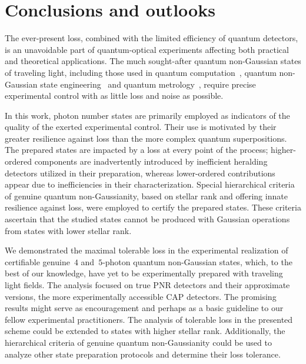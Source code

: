 \documentclass{article}
\begin{document}
%

\FloatBarrier
\section{Conclusions and outlooks}

The ever-present loss, combined with the limited efficiency of quantum detectors, is an unavoidable part of quantum-optical experiments affecting both practical and theoretical applications. The much sought-after quantum non-Gaussian states of traveling light, including those used in quantum computation~\cite{lloyd1999,gottesman2001,menicucci2014,baragiola2019,bourassa2021,madsen2022,aghaeerad2025}, quantum non-Gaussian state engineering~\cite{filip2005,marek2009,marek2011,yukawa2013b,miyata2016,marek2018a,sakaguchi2023} and quantum metrology~\cite{oh2020,hanamura2023}, require precise experimental control with as little loss and noise as possible.

In this work, photon number states are primarily employed as indicators of the quality of the exerted experimental control. Their use is motivated by their greater resilience against loss than the more complex quantum superpositions. The prepared states are impacted by a loss at every point of the process; higher-ordered components are inadvertently introduced by inefficient heralding detectors utilized in their preparation, whereas lower-ordered contributions appear due to inefficiencies in their characterization. Special hierarchical criteria of genuine quantum non-Gaussianity, based on stellar rank and offering innate resilience against loss, were employed to certify the prepared states. These criteria ascertain that the studied states cannot be produced with Gaussian operations from states with lower stellar rank. 

We demonstrated the maximal tolerable loss in the experimental realization of certifiable genuine~$4$ and~$5$-photon quantum non-Gaussian states, which, to the best of our knowledge, have yet to be experimentally prepared with traveling light fields. The analysis focused on true PNR detectors and their approximate versions, the more experimentally accessible CAP detectors. The promising results might serve as encouragement and perhaps as a basic guideline to our fellow experimental practitioners.
The analysis of tolerable loss in the presented scheme could be extended to states with higher stellar rank. Additionally, the hierarchical criteria of genuine quantum non-Gaussianity could be used to analyze other state preparation protocols and determine their loss tolerance.
\end{document}
